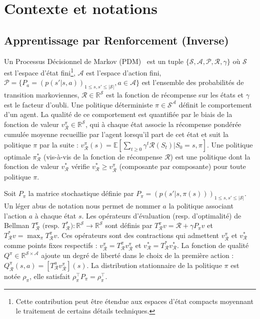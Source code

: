 \documentclass[english,utf8]{./hermes-journal}
\newcommand{\p}{\mathcal{P}}
\newcommand{\R}{\mathcal{R}}
\newcommand{\s}{\mathcal{S}}
\newcommand{\A}{\mathcal{A}}
\newcommand{\E}{\mathbb{E}}
\begin{document}
\section{Contexte et notations}
\label{sec:background}

\subsection{Apprentissage par Renforcement (Inverse)}
\label{subsec:background:irl}

Un Processus Décisionnel de Markov (PDM)~\cite{Puterman:1994} est un tuple $\{\s,\A,\p,\R,\gamma\}$ où $\s$ est l'espace d'état fini\footnote{Cette contribution peut être étendue aux espaces d'état compacts moyennant le traitement de certains détails techniques.}, $\A$ est l'espace d'action fini, $\p =
\{P_a = (p(s'|s,a))_{1\leq s,s'\leq |\s|}, a\in\A\}$ est l'ensemble des probabilités de transition markoviennes, $\R\in\mathbb{R}^\s$ est la fonction de récompense sur les états et $\gamma$ est le facteur d'oubli.
Une politique déterministe $\pi\in\s^\A$ définit le comportement d'un agent. La qualité de ce comportement est quantifiée par le biais de la fonction de valeur $v_\R^\pi\in\mathbb{R}^\s$, qui à chaque état associe la récompense pondérée cumulée moyenne recueillie par l'agent lorsqu'il part de cet état et suit la politique $\pi$ par la suite : $v_\R^\pi(s) = \E[\sum_{t\geq 0} \gamma^t \R(S_t)|S_0=s,\pi]$. Une politique optimale $\pi_\R^*$ (vis-à-vis de la fonction de récompense $\R$) est une politique dont la fonction de valeur $v^*_\R$ vérifie $v_\R^* \geq v_\R^\pi$ (composante par composante) pour toute politique $\pi$.

Soit $P_\pi$ la matrice stochastique définie par $P_\pi =
(p(s'|s,\pi(s)))_{1\leq s,s'\leq |\s|}$. Un léger abus de notation nous permet de nommer $a$ la politique associant l'action $a$ à chaque état $s$. Les opérateurs d'évaluation (resp. d'optimalité) de Bellman $T^\pi_\R\text{ (resp. $T^*_\R$)}:\mathbb{R}^\s
\rightarrow \mathbb{R}^\s$ sont définis par $T^\pi_\R v = \R + \gamma
P_\pi v$ et $T_\R^*v = \max_\pi T_\R^\pi v$.
Ces opérateurs sont des contractions qui admettent $v_\R^\pi$ et $v^*_\R$ comme points fixes respectifs : $v_\R^\pi = T^\pi_\R v_\R^\pi$ et $v^*_\R = T^*_\R v^*_\R$.
La fonction de qualité $Q^\pi\in\mathbb{R}^{\s\times \A}$ ajoute un degré de liberté dans le choix de la première action : $Q_\R^\pi(s,a)
= [T^a_\R v^\pi_\R](s)$. La distribution stationnaire de la politique $\pi$ est notée $\rho_\pi$, elle satisfait $\rho_\pi^\top P_\pi = \rho_\pi^\top$.
\end{document}
